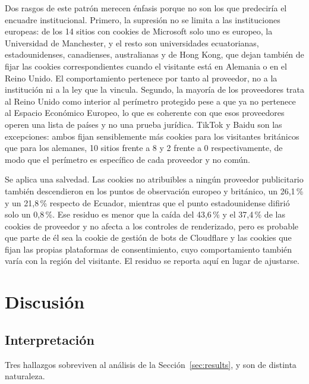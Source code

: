 \documentclass[pdflatex,sn-basic,Numbered,iicol]{sn-jnl}
\theoremstyle{thmstyleone}
\theoremstyle{thmstyletwo}
\theoremstyle{thmstylethree}
\begin{document}
Dos rasgos de este patr\'on merecen \'enfasis porque no son los que predecir\'ia el encuadre institucional. Primero, la supresi\'on no se limita a las instituciones europeas: de los 14 sitios con cookies de Microsoft solo uno es europeo, la Universidad de Manchester, y el resto son universidades ecuatorianas, estadounidenses, canadienses, australianas y de Hong Kong, que dejan tambi\'en de fijar las cookies correspondientes cuando el visitante est\'a en Alemania o en el Reino Unido. El comportamiento pertenece por tanto al proveedor, no a la instituci\'on ni a la ley que la vincula. Segundo, la mayor\'ia de los proveedores trata al Reino Unido como interior al per\'imetro protegido pese a que ya no pertenece al Espacio Econ\'omico Europeo, lo que es coherente con que esos proveedores operen una lista de pa\'ises y no una prueba jur\'idica. TikTok y Baidu son las excepciones: ambos fijan sensiblemente m\'as cookies para los visitantes brit\'anicos que para los alemanes, 10 sitios frente a 8 y 2 frente a 0 respectivamente, de modo que el per\'imetro es espec\'ifico de cada proveedor y no com\'un.

Se aplica una salvedad. Las cookies no atribuibles a ning\'un proveedor publicitario tambi\'en descendieron en los puntos de observaci\'on europeo y brit\'anico, un 26,1\,\% y un 21,8\,\% respecto de Ecuador, mientras que el punto estadounidense difiri\'o solo un 0,8\,\%. Ese residuo es menor que la ca\'ida del 43,6\,\% y el 37,4\,\% de las cookies de proveedor y no afecta a los controles de renderizado, pero es probable que parte de \'el sea la cookie de gesti\'on de bots de Cloudflare y las cookies que fijan las propias plataformas de consentimiento, cuyo comportamiento tambi\'en var\'ia con la regi\'on del visitante. El residuo se reporta aqu\'i en lugar de ajustarse.

\section{Discusi\'on}\label{sec:discussion}

\subsection{Interpretaci\'on}\label{sec:discussion-interp}

Tres hallazgos sobreviven al an\'alisis de la Secci\'on~\ref{sec:results}, y son de distinta naturaleza.
\end{document}
